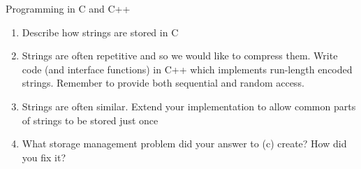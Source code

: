 \documentclass{tripos}  %
\begin{document}
\begin{question}[MockIB,year=2024,paper=2,question=6,author=rrw]{Programming in C and C++}


  \begin{enumerate}
  \item Describe how strings are stored in C 
  \item Strings are often repetitive and so we would like to compress them. Write code (and interface functions) in C++ which implements run-length encoded strings. Remember to provide both sequential and random access. 
  \item Strings are often similar. Extend your implementation to allow common parts of strings to be stored just once 
  \item What storage management problem did your answer to (c) create? How did you fix it? 
  \end{enumerate}

\end{question}
\end{document}
